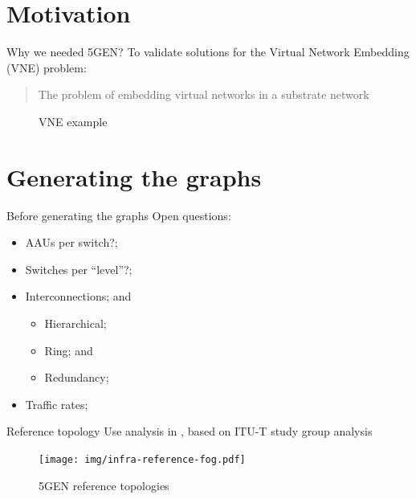 \documentclass{beamer}
\begin{document}
\section{Motivation}
\begin{frame}{Why we needed 5GEN?}
    To validate solutions for the Virtual Network Embedding (VNE) problem:
    \begin{center}
        \begin{minipage}{0.6\textwidth}
            \begin{block}{}
                \blockquote[\cite{fischer2013virtual}][]{The problem of embedding virtual networks in a substrate network}
            \end{block}
        \end{minipage}
    \end{center}
    \begin{figure}
        \caption{VNE example}
        \label{fig:vne-example}
    \end{figure}
\end{frame}


\section{Generating the graphs}
\begin{frame}{Before generating the graphs}
    Open questions:
    \begin{itemize}
        \item AAUs per switch?;
        \item Switches per ``level''?;
        \item Interconnections; and
            \begin{itemize}
                \item Hierarchical;
                \item Ring; and
                \item Redundancy;
            \end{itemize}
        \item Traffic rates;
    \end{itemize}
\end{frame}

\begin{frame}{Reference topology}
    Use analysis in \cite{luca-5g-qos}, based on ITU-T study group analysis \cite{itu}
    \begin{figure}
        \texttt{[image: img/infra-reference-fog.pdf]}
        \caption{5GEN reference topologies}
    \end{figure}
\end{frame}
\end{document}
